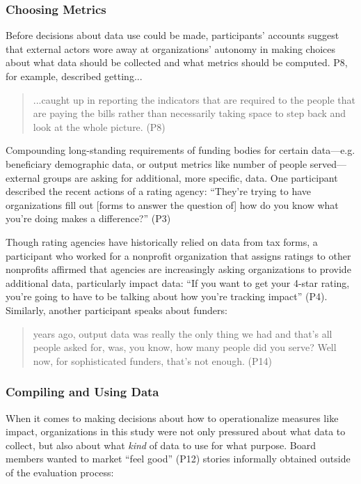 \subsubsection{Choosing Metrics}
Before decisions about data use could be made, participants’ accounts suggest that external actors wore away at organizations’ autonomy in making choices about what data should be collected and what metrics should be computed. P8, for example, described getting...

\begin{quote}\singlespacing...caught up in reporting the indicators that are required to the people that are paying the bills rather than necessarily taking space to step back and look at the whole picture. (P8)\end{quote}

Compounding long-standing requirements of funding bodies for certain data---e.g. beneficiary demographic data, or output metrics like number of people served---external groups are asking for additional, more specific, data. One participant described the recent actions of a rating agency: “They’re trying to have organizations fill out [forms to answer the question of] how do you know what you’re doing makes a difference?” (P3)

Though rating agencies have historically relied on data from tax forms, a participant who worked for a nonprofit organization that assigns ratings to other nonprofits affirmed that agencies are increasingly asking organizations to provide additional data, particularly impact data: “If you want to get your 4-star rating, you’re going to have to be talking about how you’re tracking impact” (P4). Similarly, another participant speaks about funders:

\begin{quote} years ago, output data was really the only thing we had and that’s all people asked for, was, you know, how many people did you serve? Well now, for sophisticated funders, that’s not enough. (P14)\end{quote}

\subsubsection{Compiling and Using Data}
When it comes to making decisions about how to operationalize measures like impact, organizations in this study were not only pressured about what data to collect, but also about what \textit{kind} of data to use for what purpose. Board members wanted to market “feel good” (P12) stories informally obtained outside of the evaluation process:

